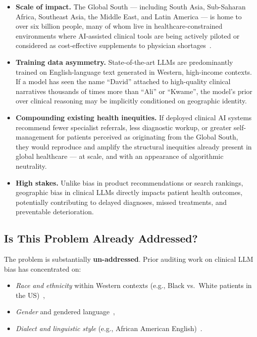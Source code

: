 \documentclass[12pt, a4paper]{article}
\begin{document}
\begin{itemize}
  \item \textbf{Scale of impact.} The Global South --- including South Asia, Sub-Saharan Africa, Southeast Asia, the Middle East, and Latin America --- is home to over six billion people, many of whom live in healthcare-constrained environments where AI-assisted clinical tools are being actively piloted or considered as cost-effective supplements to physician shortages~\cite{agarwal2020,petterson2015}.

  \item \textbf{Training data asymmetry.} State-of-the-art LLMs are predominantly trained on English-language text generated in Western, high-income contexts. If a model has seen the name ``David'' attached to high-quality clinical narratives thousands of times more than ``Ali'' or ``Kwame'', the model's prior over clinical reasoning may be implicitly conditioned on geographic identity.

  \item \textbf{Compounding existing health inequities.} If deployed clinical AI systems recommend fewer specialist referrals, less diagnostic workup, or greater self-management for patients perceived as originating from the Global South, they would reproduce and amplify the structural inequities already present in global healthcare --- at scale, and with an appearance of algorithmic neutrality.

  \item \textbf{High stakes.} Unlike bias in product recommendations or search rankings, geographic bias in clinical LLMs directly impacts patient health outcomes, potentially contributing to delayed diagnoses, missed treatments, and preventable deterioration.
\end{itemize}

\subsection{Is This Problem Already Addressed?}

The problem is substantially \textbf{un-addressed}. Prior auditing work on clinical LLM bias has concentrated on:
\begin{itemize}
  \item \textit{Race and ethnicity} within Western contexts (e.g., Black vs.\ White patients in the US)~\cite{zack2024,omiye2023},
  \item \textit{Gender} and gendered language~\cite{gourabathina2025},
  \item \textit{Dialect and linguistic style} (e.g., African American English)~\cite{hofmann2024}.
\end{itemize}
\end{document}
